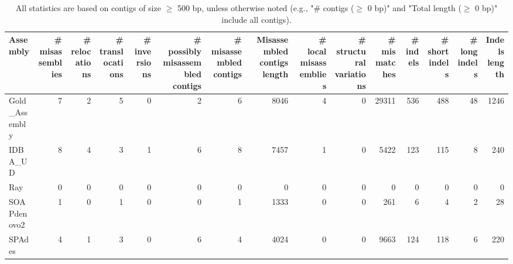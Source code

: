 \documentclass[12pt,a4paper]{article}
\begin{document}
\begin{table}[ht]
\begin{center}
\caption{All statistics are based on contigs of size $\geq$ 500 bp, unless otherwise noted (e.g., "\# contigs ($\geq$ 0 bp)" and "Total length ($\geq$ 0 bp)" include all contigs).}
\begin{tabular}{|l*{14}{|r}|}
\hline
Assembly & \# misassemblies &     \# relocations &     \# translocations &     \# inversions & \# possibly misassembled contigs & \# misassembled contigs & Misassembled contigs length & \# local misassemblies & \# structural variations & \# mismatches & \# indels &     \# short indels &     \# long indels & Indels length \\ \hline
Gold\_Assembly & 7 & 2 & 5 & 0 & 2 & 6 & 8046 & 4 & 0 & 29311 & 536 & 488 & 48 & 1246 \\ \hline
IDBA\_UD & 8 & 4 & 3 & 1 & 6 & 8 & 7457 & 1 & 0 & 5422 & 123 & 115 & 8 & 240 \\ \hline
Ray & 0 & 0 & 0 & 0 & 0 & 0 & 0 & 0 & 0 & 0 & 0 & 0 & 0 & 0 \\ \hline
SOAPdenovo2 & 1 & 0 & 1 & 0 & 0 & 1 & 1333 & 0 & 0 & 261 & 6 & 4 & 2 & 28 \\ \hline
SPAdes & 4 & 1 & 3 & 0 & 6 & 4 & 4024 & 0 & 0 & 9663 & 124 & 118 & 6 & 220 \\ \hline
\end{tabular}
\end{center}
\end{table}
\end{document}
